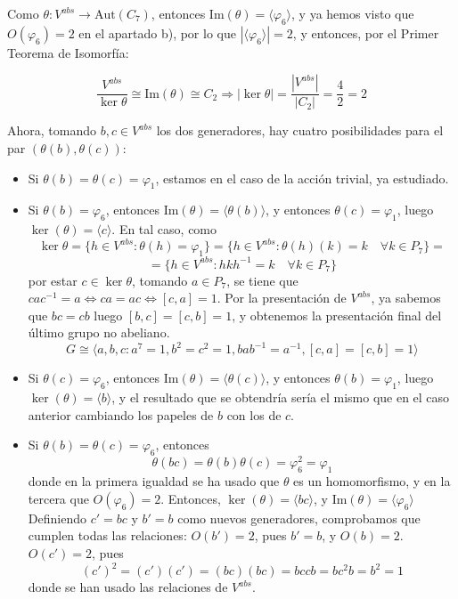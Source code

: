 \documentclass[12pt]{article}
\newcommand{\Aut}{\text{Aut}}
\begin{document}
\begin{ejercicio}
\begin{enumerate}[label=(\alph*)]
\begin{itemize}
\begin{itemize}
                    Como $\theta : V^{abs} \to \Aut(C_7)$, entonces $\text{Im}(\theta) = \langle \varphi_6 \rangle$, y ya hemos visto que $O(\varphi_6) = 2$ en el apartado b), por lo que $|\langle \varphi_6 \rangle| = 2$, y entonces, por el Primer Teorema de Isomorfía:
                    
                    $$\dfrac{V^{abs}}{\ker \theta} \cong \text{Im}(\theta) \cong C_2 \Longrightarrow |\ker \theta| = \dfrac{|V^{abs}|}{|C_2|} = \dfrac{4}{2} = 2$$

                    Ahora, tomando $b,c \in V^{abs}$ los dos generadores, hay cuatro posibilidades para el par $(\theta(b), \theta(c))$:

                    \begin{itemize}
                        \item Si $\theta(b) = \theta(c) = \varphi_1$, estamos en el caso de la acción trivial, ya estudiado.
                        \item Si $\theta(b) = \varphi_6$, entonces $\text{Im}(\theta) = \langle \theta(b) \rangle$, y entonces $\theta(c) = \varphi_1$, luego $\ker(\theta) = \langle c \rangle$. En tal caso,
                        como $$\ker \theta = \{h \in V^{abs} : \theta(h) = \varphi_1\} = \{h \in V^{abs} : \theta(h)(k) = k \quad \forall k \in P_7\} = $$$$ = \{h \in V^{abs} : hkh^{-1} = k \quad \forall k \in P_7\}$$
                        por estar $c \in \ker \theta$, tomando $a \in P_7$, se tiene que $cac^{-1} = a \iff ca = ac \iff [c,a] = 1$. Por la presentación de $V^{abs}$, ya sabemos que $bc = cb$ luego $[b,c] = [c,b] = 1$, y obtenemos la presentación final del último grupo no abeliano.
                        $$G \cong \langle a,b,c : a^7=1,b^2 = c^2=1, bab^{-1} = a^{-1}, [c,a] = [c,b] = 1 \rangle$$
                        \item Si $\theta(c) = \varphi_6$, entonces $\text{Im}(\theta) = \langle \theta(c) \rangle$, y entonces $\theta(b) = \varphi_1$, luego $\ker(\theta) = \langle b \rangle$, y el resultado que se obtendría sería el mismo que en el caso anterior cambiando los papeles de $b$ con los de $c$.
                        \item Si $\theta(b) = \theta(c) = \varphi_6$, entonces 
                        $$\theta(bc) = \theta(b)\theta(c) = \varphi_6^2 = \varphi_1$$
                        donde en la primera igualdad se ha usado que $\theta$ es un homomorfismo, y en la tercera que $O(\varphi_6) = 2$. Entonces, $\ker(\theta) = \langle bc \rangle$, y $\text{Im}(\theta) = \langle \varphi_6 \rangle$ Definiendo $c' = bc$ y $b' = b$ como nuevos generadores,
                        comprobamos que cumplen todas las relaciones: $O(b') = 2$, pues $b' = b$, y $O(b) = 2$. $O(c') = 2$, pues $$(c') ^ 2 = (c')(c') = (bc)(bc) = bccb = bc^2b = b^2 = 1$$ donde se han usado las relaciones de $V^{abs}$. \\


\end{itemize}
\end{itemize}
\end{itemize}
\end{enumerate}
\end{ejercicio}
\end{document}
